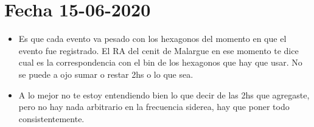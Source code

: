 










\section{Fecha  15-06-2020}

\begin{itemize}
	\item Es que cada evento va pesado con los hexagonos del momento en que el evento fue registrado. El RA del cenit de Malargue en ese momento te dice cual es la correspondencia con el bin de los hexagonos que hay que usar. No se puede a ojo sumar o restar 2hs o lo que sea.
	\item A lo mejor no te estoy entendiendo bien lo que decir de las 2hs que agregaste, pero no hay nada arbitrario en la frecuencia siderea, hay que poner todo consistentemente.
\end{itemize}




